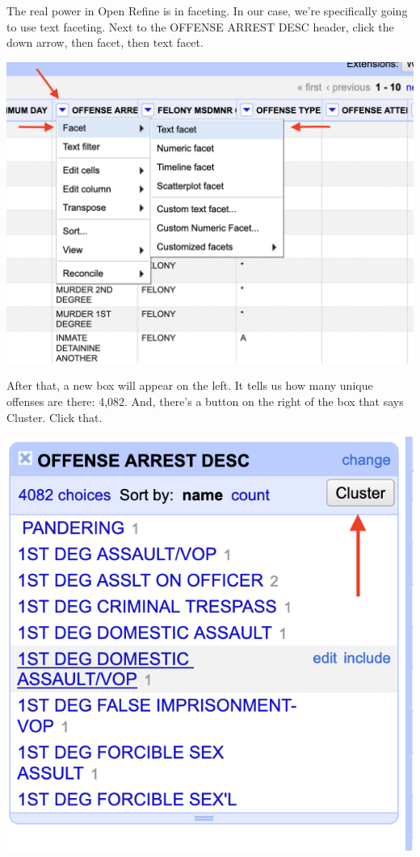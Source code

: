 \documentclass[]{book}
\begin{document}
The real power in Open Refine is in faceting. In our case, we're specifically going to use text faceting. Next to the OFFENSE ARREST DESC header, click the down arrow, then facet, then text facet.

\includegraphics[width=14.67in]{images/open3}

After that, a new box will appear on the left. It tells us how many unique offenses are there: 4,082. And, there's a button on the right of the box that says Cluster. Click that.

\includegraphics[width=8.42in]{images/open4}
\end{document}
